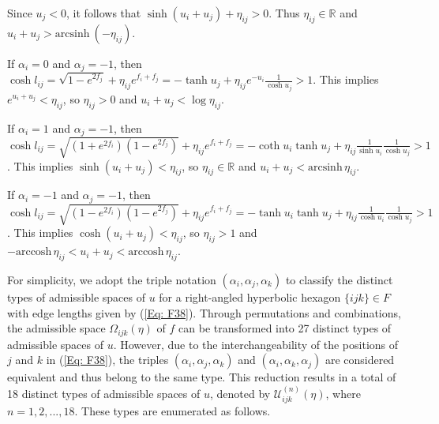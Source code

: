 \documentclass[12pt]{amsart}
\theoremstyle{definition}
\begin{document}
\begin{description}
    Since $u_j<0$, it follows that $\sinh(u_i+u_j)+\eta_{ij}>0$.
    Thus $\eta_{ij}\in \mathbb{R}$ and $u_i+u_j>\mathrm{arcsinh}\ (-\eta_{ij})$.
\item[(vii)] If $\alpha_i=0$ and $\alpha_j=-1$, then $\cosh l_{ij}=\sqrt{1-e^{2f_j}}+\eta_{ij}e^{f_i+f_j}=-\tanh u_j+\eta_{ij}e^{-u_i}\frac{1}{\cosh u_j}>1$. 
    This implies $e^{u_i+u_j}<\eta_{ij}$, so $\eta_{ij}>0$ and $u_i+u_j<\log \eta_{ij}$.
\item[(viii)] If $\alpha_i=1$ and $\alpha_j=-1$, then $\cosh l_{ij}=\sqrt{(1+e^{2f_i})(1-e^{2f_j})}+\eta_{ij}e^{f_i+f_j}
    =-\coth u_i\tanh u_j+\eta_{ij}\frac{1}{\sinh u_i}\frac{1}{\cosh u_j}>1$.
    This implies $\sinh(u_i+u_j)<\eta_{ij}$, so $\eta_{ij}\in \mathbb{R}$ and $u_i+u_j<\mathrm{arcsinh}\, \eta_{ij}$.
\item[(ix)] If $\alpha_i=-1$ and $\alpha_j=-1$, then $\cosh l_{ij}=\sqrt{(1-e^{2f_i})(1-e^{2f_j})}+\eta_{ij}e^{f_i+f_j}
    =-\tanh u_i\tanh u_j+\eta_{ij}\frac{1}{\cosh u_i}\frac{1}{\cosh u_j}>1$.
    This implies $\cosh(u_i+u_j)<\eta_{ij}$, so $\eta_{ij}>1$ and $-\mathrm{arccosh}\,  \eta_{ij}<u_i+u_j<\mathrm{arccosh}\, \eta_{ij}$.
\end{description}

For simplicity, we adopt the triple notation $(\alpha_i,\alpha_j,\alpha_k)$ to classify the distinct types of admissible spaces of $u$ for a right-angled hyperbolic hexagon $\{ijk\}\in F$ with edge lengths given by (\ref{Eq: F38}).
Through permutations and combinations, the admissible space $\Omega_{ijk}(\eta)$ of $f$ can be transformed into 27 distinct types of admissible spaces of $u$.
However, due to the interchangeability of the positions of $j$ and $k$ in (\ref{Eq: F38}),
the triples $(\alpha_i,\alpha_j,\alpha_k)$ and $(\alpha_i,\alpha_k,\alpha_j)$ are considered equivalent and thus belong to the same type.
This reduction results in a total of 18 distinct types of admissible spaces of $u$, denoted by $\mathcal{U}^{(n)}_{ijk}(\eta)$, where $n=1,2,...,18$.
These types are enumerated as follows.
\end{document}
